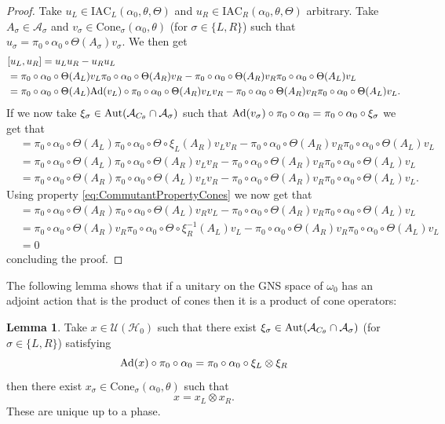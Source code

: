 \documentclass[12pt,a4paper,twoside]{article}
\newcommand{\IAC}{\textrm{IAC}}
\let\originalleft\left
\let\originalright\right
\renewcommand{\left}{\mathopen{}\mathclose\bgroup\originalleft}
\renewcommand{\right}{\aftergroup\egroup\originalright}
\newcommand{\UU}{\mathcal U}
\newcommand{\HH}{\mathcal H}
\renewcommand{\AA}{\mathcal A}
\newcommand{\Ad}[1]{\textrm{Ad}\left(#1\right)}
\newcommand{\Aut}[1]{\textrm{Aut}\left(#1\right)}
\theoremstyle{definition}
\newtheorem{lemma}[theorem]{Lemma}
\numberwithin{equation}{section}
\begin{document}
\begin{proof}
	Take $u_L\in\IAC_L(\alpha_0,\theta,\Theta)$ and $u_R\in\IAC_R(\alpha_0,\theta,\Theta)$ arbitrary. Take $A_\sigma\in\AA_\sigma$ and $v_\sigma\in\textrm{Cone}_\sigma(\alpha_0,\theta)$ (for $\sigma\in\{L,R\}$) such that $u_\sigma=\pi_0\circ\alpha_0\circ\Theta(A_\sigma)v_\sigma$. We then get
	\begin{align}
		&[u_L,u_R]=u_Lu_R-u_Ru_L\\
		&=\pi_0\circ\alpha_0\circ\Theta(A_L)v_L\pi_0\circ\alpha_0\circ\Theta(A_R)v_R-\pi_0\circ\alpha_0\circ\Theta(A_R)v_R\pi_0\circ\alpha_0\circ\Theta(A_L)v_L\\
		&=\pi_0\circ\alpha_0\circ\Theta(A_L)\Ad{v_L}\circ\pi_0\circ\alpha_0\circ\Theta(A_R)v_Lv_R-\pi_0\circ\alpha_0\circ\Theta(A_R)v_R\pi_0\circ\alpha_0\circ\Theta(A_L)v_L.
	\end{align}
	If we now take $\xi_\sigma\in\Aut{\AA_{C_\theta}\cap\AA_\sigma}$ such that $\Ad{v_\sigma}\circ\pi_0\circ\alpha_0=\pi_0\circ\alpha_0\circ\xi_\sigma$ we get that
	\begin{align}
		&=\pi_0\circ\alpha_0\circ\Theta(A_L)\pi_0\circ\alpha_0\circ\Theta\circ\xi_L(A_R)v_Lv_R-\pi_0\circ\alpha_0\circ\Theta(A_R)v_R\pi_0\circ\alpha_0\circ\Theta(A_L)v_L\\
		&=\pi_0\circ\alpha_0\circ\Theta(A_L)\pi_0\circ\alpha_0\circ\Theta(A_R)v_Lv_R-\pi_0\circ\alpha_0\circ\Theta(A_R)v_R\pi_0\circ\alpha_0\circ\Theta(A_L)v_L\\
		&=\pi_0\circ\alpha_0\circ\Theta(A_R)\pi_0\circ\alpha_0\circ\Theta(A_L)v_Lv_R-\pi_0\circ\alpha_0\circ\Theta(A_R)v_R\pi_0\circ\alpha_0\circ\Theta(A_L)v_L.
	\end{align}
	Using property \eqref{eq:CommutantPropertyCones} we now get that
	\begin{align}
		&=\pi_0\circ\alpha_0\circ\Theta(A_R)\pi_0\circ\alpha_0\circ\Theta(A_L)v_Rv_L-\pi_0\circ\alpha_0\circ\Theta(A_R)v_R\pi_0\circ\alpha_0\circ\Theta(A_L)v_L\\
		&=\pi_0\circ\alpha_0\circ\Theta(A_R)v_R\pi_0\circ\alpha_0\circ\Theta\circ\xi_R^{-1}(A_L)v_L-\pi_0\circ\alpha_0\circ\Theta(A_R)v_R\pi_0\circ\alpha_0\circ\Theta(A_L)v_L\\
		&=0
	\end{align}
	concluding the proof.
\end{proof}
The following lemma shows that if a unitary on the GNS space of $\omega_0$ has an adjoint action that is the product of cones then it is a product of cone operators:
\begin{lemma}\label{lem:UsingIrreducibilityAndWignerTheorem}
	Take $x\in\UU(\HH_0)$ such that there exist $\xi_\sigma\in\Aut{\AA_{C_\theta}\cap\AA_\sigma}$ (for $\sigma\in\{L,R\}$) satisfying
	\begin{equation}
		\Ad{x}\circ\pi_0\circ\alpha_0=\pi_0\circ\alpha_0\circ\xi_L\otimes\xi_R
	\end{equation}
	then there exist $x_\sigma\in\textrm{Cone}_\sigma(\alpha_0,\theta)$ such that
	\begin{equation}
		x=x_L\otimes x_R.
	\end{equation}
	These are unique up to a phase.
\end{lemma}
\end{document}
